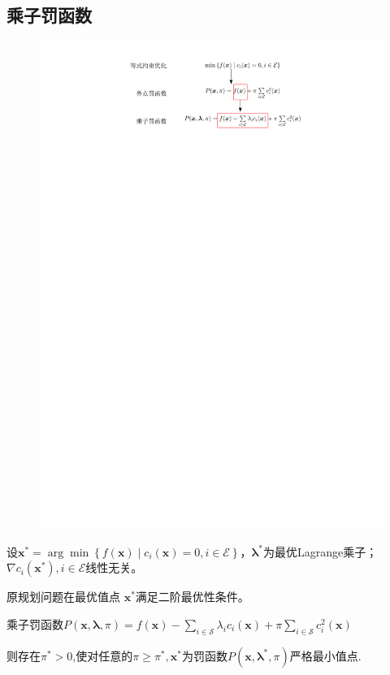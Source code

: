 \subsection{乘子罚函数}
\begin{figure}[htbp]
    \centering
    \includegraphics{image/乘子罚函数.pdf}
\end{figure}
\begin{theorem}
    设$\boldsymbol{x}^*=\arg\min\left\{f(\boldsymbol{x})\mid c_i(\boldsymbol{x})=0,i\in\mathcal{E}\right\}$，$\boldsymbol{\lambda}^*$为最优Lagrange乘子；$\nabla c_i(\boldsymbol{x}^*),i\in\mathcal{E}$线性无关。
    
    原规划问题在最优值点 $\boldsymbol{x}^*$满足二阶最优性条件。

    乘子罚函数$P(\boldsymbol{x},\boldsymbol{\lambda},\pi)=f(\boldsymbol{x})-\sum\limits_{i\in\mathcal{S}}\lambda_ic_i(\boldsymbol{x})+\pi\sum_{i\in\mathcal{S}}c_i^2(\boldsymbol{x})$ 
    
    则存在$\pi^*>0$,使对任意的$\pi\geqslant\pi^*,\boldsymbol{x}^*$为罚函数$P(\boldsymbol{x},\boldsymbol{\lambda}^*,\pi)$严格最小值点.
\end{theorem}